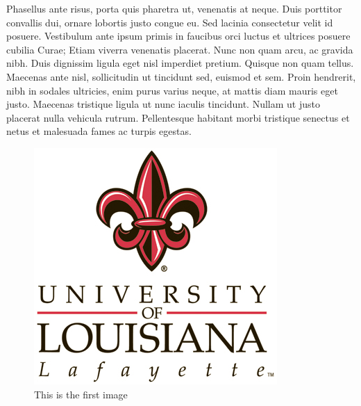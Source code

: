 \documentclass[12pt]{report}	%
\begin{document}
Phasellus ante risus, porta quis pharetra ut, venenatis at neque. Duis
porttitor convallis dui, ornare lobortis justo congue eu. Sed lacinia
consectetur velit id posuere. Vestibulum ante ipsum primis in faucibus
orci luctus et ultrices posuere cubilia Curae; Etiam viverra venenatis
placerat. Nunc non quam arcu, ac gravida nibh. Duis dignissim ligula
eget nisl imperdiet pretium. Quisque non quam tellus. Maecenas ante
nisl, sollicitudin ut tincidunt sed, euismod et sem. Proin hendrerit,
nibh in sodales ultricies, enim purus varius neque, at mattis diam
mauris eget justo. Maecenas tristique ligula ut nunc iaculis
tincidunt. Nullam ut justo placerat nulla vehicula rutrum. Pellentesque
habitant morbi tristique senectus et netus et malesuada fames ac turpis
egestas.
\begin{figure}[htb]
  \centering
  \includegraphics[draft=false,width=0.4\linewidth]{ull1.jpg}
  \caption{This is the first image}
  \label{fig:ull1}
\end{figure}
  
\end{document}
